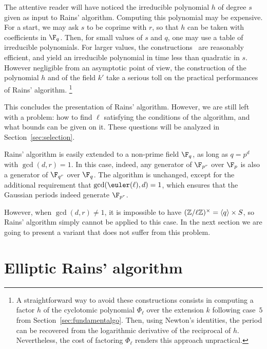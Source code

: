 The attentive reader will have noticed the irreducible polynomial $h$
of degree $s$ given as input to Rains' algorithm. Computing this
polynomial may be expensive. For a start, we may ask $s$ to be coprime
with $r$, so that $h$ can be taken with coefficients in $\F_q$. Then,
for small values of $s$ and $q$, one may use a table of irreducible
polynomials. For larger values, the
constructions~\cite{couveignes+lercier11,DeDoSc13,DeDoSc2014}
are reasonably efficient, and yield an irreducible polynomial in time
less than quadratic in $s$.
However negligible from an asymptotic point of view, the construction
of the polynomial $h$ and of the field $k'$ take a serious toll on the
practical performances of Rains' algorithm.%
\footnote{
A straightforward way to avoid these constructions consists in computing
a factor $h$ of the cyclotomic polynomial $\Phi_\ell$
over the extension $k$ following case~$5$ from Section~\ref{sec:fundamentalgo}.
Then, using Newton's identities, the period can be recovered from the
logarithmic derivative of the reciprocal of $h$. %
Nevertheless, the cost of factoring $\Phi_\ell$ renders this approach
unpractical.}

This concludes the presentation of Rains' algorithm. However, we are
still left with a problem: how to find $\ell$ satisfying the
conditions of the algorithm, and what bounds can be given on it. These
questions will be analyzed in Section~\ref{sec:selection}.

\begin{note}
  \label{note:rains-non-prime}
  Rains' algorithm is easily extended to a non-prime field $\F_q$, as
  long as $q=p^d$ with $\gcd(d,r)=1$. In this case, indeed, any
  generator of $\F_{p^r}$ over $\F_p$ is also a generator of
  $\F_{q^r}$ over $\F_q$. The algorithm is unchanged, except for the
  additional requirement that $\gcd(\euler(\ell),d)=1$, which ensures
  that the Gaussian periods indeed generate $\F_{p^r}$.

  However, when $\gcd(d,r)\ne 1$, it is impossible to have
  $(\mathbb{Z}/\ell\mathbb{Z})^\times=\langle q\rangle\times S$, so Rains' algorithm
  simply cannot be applied to this case. In the next section we are
  going to present a variant that does not suffer from this problem.
\end{note}



\section{Elliptic Rains' algorithm}
\label{sec:rains-elliptic}

